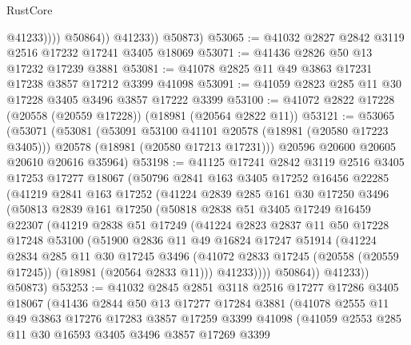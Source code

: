 \begin{lexlean}{RustCore}
\begin{coremodule}
                      @41233))))
              @50864))
          @41233))
      @50873)
@53065 := @41032 @2827 @2842 @3119 @2516 @17232 @17241 @3405 @18069
@53071 := @41436 @2826 @50 @13 @17232 @17239 @3881
@53081 := @41078 @2825 @11 @49 @3863 @17231 @17238 @3857 @17212 @3399 @41098
@53091 := @41059 @2823 @285 @11 @30 @17228 @3405 @3496 @3857 @17222 @3399
@53100 := @41072 @2822 @17228 (@20558 (@20559 @17228)) (@18981 (@20564 @2822 @11))
@53121 := @53065
    (@53071
      (@53081
        (@53091 @53100 @41101 @20578 (@18981 (@20580 @17223 @3405)))
        @20578
        (@18981 (@20580 @17213 @17231)))
      @20596
      @20600
      @20605
      @20610
      @20616
      @35964)
@53198 := @41125
    @17241
    @2842
    @3119
    @2516
    @3405
    @17253
    @17277
    @18067
    (@50796
      @2841
      @163
      @3405
      @17252
      @16456
      @22285
      (@41219
        @2841
        @163
        @17252
        (@41224
          @2839
          @285
          @161
          @30
          @17250
          @3496
          (@50813
            @2839
            @161
            @17250
            (@50818
              @2838
              @51
              @3405
              @17249
              @16459
              @22307
              (@41219
                @2838
                @51
                @17249
                (@41224
                  @2823
                  @2837
                  @11
                  @50
                  @17228
                  @17248
                  @53100
                  (@51900
                    @2836
                    @11
                    @49
                    @16824
                    @17247
                    @51914
                    (@41224
                      @2834
                      @285
                      @11
                      @30
                      @17245
                      @3496
                      (@41072 @2833 @17245 (@20558 (@20559 @17245)) (@18981 (@20564 @2833 @11)))
                      @41233))))
              @50864))
          @41233))
      @50873)
@53253 := @41032
    @2845
    @2851
    @3118
    @2516
    @17277
    @17286
    @3405
    @18067
    (@41436
      @2844
      @50
      @13
      @17277
      @17284
      @3881
      (@41078
        @2555
        @11
        @49
        @3863
        @17276
        @17283
        @3857
        @17259
        @3399
        @41098
        (@41059
          @2553
          @285
          @11
          @30
          @16593
          @3405
          @3496
          @3857
          @17269
          @3399

\end{coremodule}
\end{lexlean}
